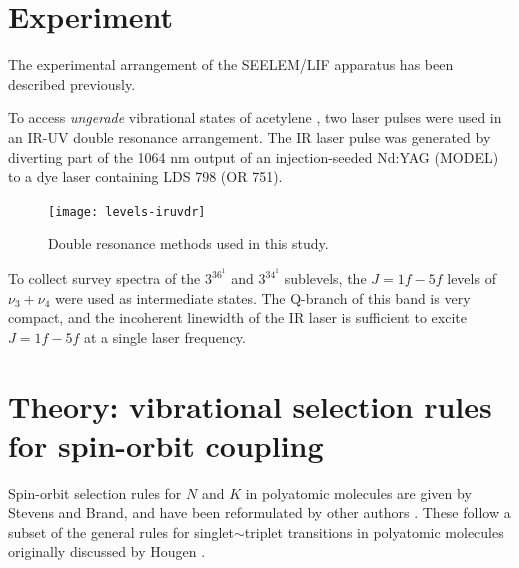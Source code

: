 \documentclass[12pt]{mitthesis}
\begin{document}
\section{Experiment}



The experimental arrangement of the SEELEM/LIF apparatus has been
described previously.


To access \emph{ungerade} vibrational states of acetylene \astate, two
laser pulses were used in an IR-UV double resonance arrangement.  The
IR laser pulse was generated by diverting part of the 1064 nm output
of an injection-seeded Nd:YAG (MODEL) to a dye laser containing LDS
798 (OR 751).



\begin{figure}
  \caption{Double resonance methods used in this study.}
  \label{fig:levels-iruvdr}
  \centering

  \texttt{[image: levels-iruvdr]}
\end{figure}


To collect survey spectra of the $3^36^1$ and $3^34^1$ 
sublevels, the $J=1f-5f$ levels of \xstate\ $\nu_3+\nu_4$
were used as intermediate states.  The Q-branch of this band is very
compact, and the incoherent linewidth of the IR laser is sufficient to
excite $J=1f-5f$ at a single laser frequency.



\section{Theory: vibrational selection rules for spin-orbit coupling}

  Spin-orbit selection rules for $N$ and $K$ in
polyatomic molecules are given by Stevens and Brand, and have been
reformulated by other authors \cite{stevens73, howard78, dupre84}.
These follow a subset of the general rules for singlet$\sim$triplet
transitions in polyatomic molecules originally discussed by Hougen
\cite{hougen64}.
\end{document}
